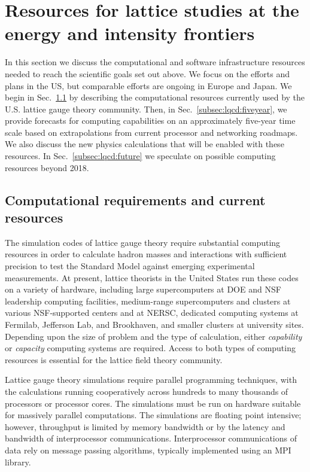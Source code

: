 \section{Resources for lattice studies at the energy and intensity frontiers}
\label{sec:lqcd:resources}

In this section we discuss the computational and software infrastructure
resources needed to reach the scientific goals set out above.  We focus on the
efforts and plans in the US, but comparable efforts are ongoing in Europe and
Japan.  We begin in Sec.~\ref{subsec:lqcd:current} by describing the
computational resources currently used by the U.S. lattice gauge theory
community.  Then, in Sec.~\ref{subsec:lqcd:fiveyear}, we provide forecasts for
computing capabilities on an approximately five-year time scale based on
extrapolations from current processor and networking roadmaps.  We also
discuss the new physics calculations that will be enabled with these
resources.  In Sec.~\ref{subsec:lqcd:future} we speculate on possible
computing resources beyond 2018.

\subsection{Computational requirements and current resources}
\label{subsec:lqcd:current}

The simulation codes of lattice gauge theory require substantial computing
resources in order to calculate hadron masses and interactions with sufficient
precision to test the Standard Model against emerging experimental
measurements.  At present, lattice theorists in the United States run these
codes on a variety of hardware, including large supercomputers at DOE and NSF
leadership computing facilities, medium-range supercomputers and clusters at
various NSF-supported centers and at NERSC, dedicated computing systems at
Fermilab, Jefferson Lab, and Brookhaven, and smaller clusters at university
sites.  Depending upon the size of problem and the type of calculation, either
{\em capability} or {\em capacity} computing systems are required.  Access to
both types of computing resources is essential for the lattice field theory
community.

Lattice gauge theory simulations require parallel programming techniques, with
the calculations running cooperatively across hundreds to many thousands of
processors or processor cores.  The simulations must be run on hardware suitable
for massively parallel computations. The simulations are floating point intensive;
however, throughput is limited by memory bandwidth or by the latency and
bandwidth of interprocessor communications. Interprocessor communications of
data rely on message passing algorithms, typically implemented using an
MPI~\cite{MPI} library.

